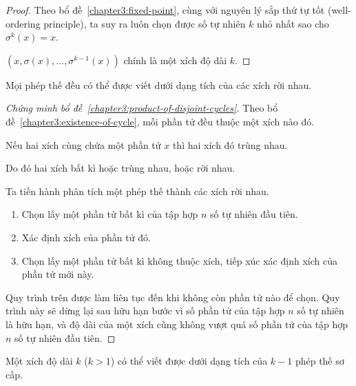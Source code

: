 \documentclass[class=linear-algebra,crop=false]{standalone}
\begin{document}
\begin{proof}
	\par Theo bổ đề~\ref{chapter3:fixed-point}, cùng với nguyên lý sắp thứ tự tốt (well-ordering principle), ta suy ra luôn chọn được số tự nhiên $k$ nhỏ nhất sao cho $\sigma^{k}(x) = x$.
	\par $(x, \sigma(x), \ldots, \sigma^{k-1}(x))$ chính là một xích độ dài $k$.
\end{proof}

\begin{lemma}\label{chapter3:product-of-disjoint-cycles}
	Mọi phép thế đều có thể được viết dưới dạng tích của các xích rời nhau.
\end{lemma}

\begin{proof}[Chứng minh bổ đề~\ref{chapter3:product-of-disjoint-cycles}]
	\par Theo bổ đề~\ref{chapter3:existence-of-cycle}, mỗi phần tử đều thuộc một xích nào đó.
	\par Nếu hai xích cùng chứa một phần tử $x$ thì hai xích đó trùng nhau.
	\par Do đó hai xích bất kì hoặc trùng nhau, hoặc rời nhau.
	\par Ta tiến hành phân tích một phép thế thành các xích rời nhau.
	\begin{enumerate}[label = (\arabic*)]
		\item Chọn lấy một phần tử bất kì của tập hợp $n$ số tự nhiên đầu tiên.
		\item Xác định xích của phần tử đó.
		\item Chọn lấy một phần tử bất kì không thuộc xích, tiếp xúc xác định xích của phần tử mới này.
	\end{enumerate}
	\par Quy trình trên được làm liên tục đến khi không còn phần tử nào để chọn. Quy trình này sẽ dừng lại sau hữu hạn bước vì số phần tử của tập hợp $n$ số tự nhiên là hữu hạn, và độ dài của một xích cũng không vượt quá số phần tử của tập hợp $n$ số tự nhiên đầu tiên.
\end{proof}

\begin{lemma}\label{chapter3:product-of-transpositions}
	Một xích độ dài $k$ ($k > 1$) có thể viết được dưới dạng tích của $k-1$ phép thế sơ cấp.
\end{lemma}
\end{document}
